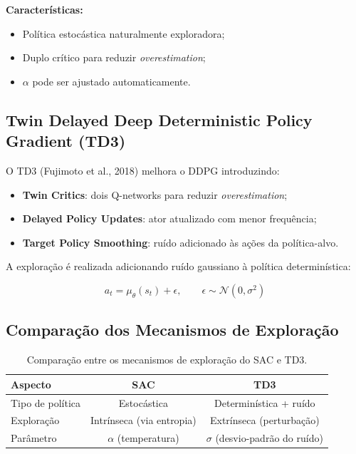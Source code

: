 \documentclass{Supervised_Reinforcement_Learningqsport}
\begin{document}
\textbf{Características:}
\begin{itemize}
    \item Política estocástica naturalmente exploradora;
    \item Duplo crítico para reduzir \textit{overestimation};
    \item $\alpha$ pode ser ajustado automaticamente.
\end{itemize}

\subsection{Twin Delayed Deep Deterministic Policy Gradient (TD3)}

O TD3 (Fujimoto et al., 2018) melhora o DDPG introduzindo:

\begin{itemize}
    \item \textbf{Twin Critics}: dois Q-networks para reduzir \textit{overestimation};
    \item \textbf{Delayed Policy Updates}: ator atualizado com menor frequência;
    \item \textbf{Target Policy Smoothing}: ruído adicionado às ações da política-alvo.
\end{itemize}

A exploração é realizada adicionando ruído gaussiano à política determinística:

\begin{equation}
a_t = \mu_{\theta}(s_t) + \epsilon,
\qquad
\epsilon \sim \mathcal{N}(0,\sigma^2)
\end{equation}

\subsection{Comparação dos Mecanismos de Exploração}

\begin{table}[H]
\centering
\caption{Comparação entre os mecanismos de exploração do SAC e TD3.}
\label{tab:sac_td3_comparison}
\begin{tabular}{|l|c|c|}
\hline
\textbf{Aspecto} & \textbf{SAC} & \textbf{TD3} \\
\hline
Tipo de política & Estocástica & Determinística + ruído \\
\hline
Exploração & Intrínseca (via entropia) & Extrínseca (perturbação) \\
\hline
Parâmetro & $\alpha$ (temperatura) & $\sigma$ (desvio-padrão do ruído) \\
\hline
\end{tabular}
\end{table}
\end{document}
